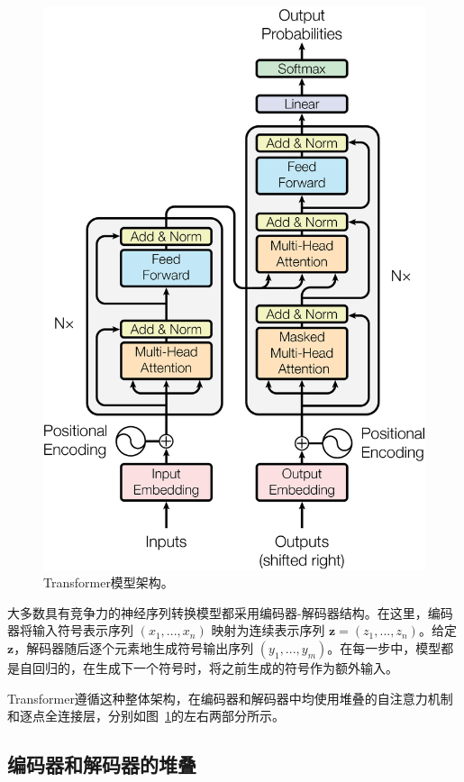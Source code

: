 \documentclass[lang=cn,a4paper,newtx]{elegantpaper}
\begin{document}
\begin{figure}
  \centering
  \includegraphics[scale=0.6]{Figures/ModalNet-21}
  \caption{Transformer模型架构。}
  \label{fig:model-arch}
\end{figure}

大多数具有竞争力的神经序列转换模型都采用编码器-解码器结构。在这里，编码器将输入符号表示序列 $(x_1, ..., x_n)$ 映射为连续表示序列 $\mathbf{z} = (z_1, ..., z_n)$。给定 $\mathbf{z}$，解码器随后逐个元素地生成符号输出序列 $(y_1,...,y_m)$。在每一步中，模型都是自回归的，在生成下一个符号时，将之前生成的符号作为额外输入。

Transformer遵循这种整体架构，在编码器和解码器中均使用堆叠的自注意力机制和逐点全连接层，分别如图~\ref{fig:model-arch}的左右两部分所示。

\subsection{编码器和解码器的堆叠}
\end{document}
